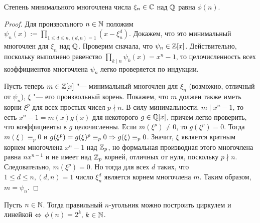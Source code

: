 \begin{theorem}
	Степень минимального многочлена числа $\xi_n \in \mathbb{C}$ над $\mathbb{Q}$ равна $\phi(n)$.
\end{theorem}

\begin{proof}
	Для произвольного $n \in \mathbb{N}$ положим $\psi_n(x) := \prod_{1 \le d \le n, (d, n) = 1}(x - \xi_n^d)$. Докажем, что это минимальный многочлен для $\xi_n$ над $\mathbb{Q}$. Проверим сначала, что $\psi_n \in \mathbb{Z}[x]$. Действительно, поскольку выполнено равенство $\prod_{k \mid n}\psi_k(x) = {x^n - 1}$, то целочисленность всех коэффициентов многочлена $\psi_n$ легко проверяется по индукции.
	
	Пусть теперь $m \in \mathbb{Z}[x]$ "--- минимальный многочлен для $\xi_n$ (возможно, отличный от $\psi_n$), $\xi$ "--- его произвольный корень. Покажем, что $m$ должен также иметь корни $\xi^p$ для всех простых чисел $p \nmid n$. В силу минимальности, $m \mid x^n - 1$, то есть $x^n - 1 = m(x)g(x)$ для некоторого $g \in \mathbb{Q}[x]$, причем легко проверить, что коэффициенты в $g$ целочисленны. Если $m(\xi^p) \ne 0$, то $g(\xi^p) = 0$. Тогда $m(\xi) \equiv_p 0$ и $g(\xi^p) = g(\xi)^p \equiv_p 0 \Rightarrow g(\xi) \equiv_p 0$. Значит, $\xi$ является кратным корнем многочлена $x^n - 1$ над $\mathbb{Z}_p$, но формальная производная этого многочлена равна $nx^{n - 1}$ и не имеет над $\mathbb{Z}_p$ корней, отличных от нуля, поскольку $p \nmid n$. Следовательно, $m(\xi^p) = 0$. Но тогда для всех $d$ таких, что $1 \le d \le n, (d, n) = 1$ число $\xi_n^d$ является корнем многочлена $m$. Таким образом, $m = \psi_n$.
\end{proof}

\begin{corollary}
	Пусть $n \in \mathbb{N}$. Тогда правильный $n$-угольник можно построить циркулем и линейкой $\Leftrightarrow$ $\phi(n) = 2^k$, $k \in \mathbb{N}$.
\end{corollary}